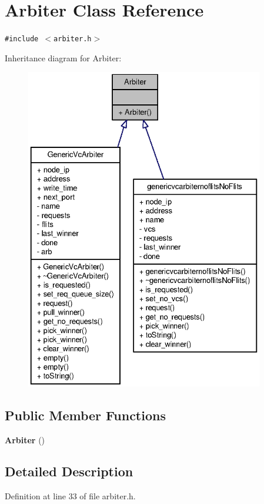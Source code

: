 \section{Arbiter Class Reference}
\label{classArbiter}
{\tt \#include $<$arbiter.h$>$}

Inheritance diagram for Arbiter:\nopagebreak
\begin{figure}[H]
\begin{center}
\leavevmode
\includegraphics[height=400pt]{classArbiter__inherit__graph}
\end{center}
\end{figure}
\subsection*{Public Member Functions}
\begin{CompactItemize}
\item 
{\bf Arbiter} ()
\end{CompactItemize}


\subsection{Detailed Description}


Definition at line 33 of file arbiter.h.

